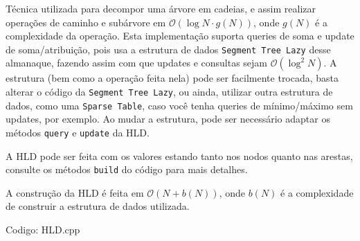 \documentclass[10pt, a4paper, oneside]{book}
\begin{document}
Técnica utilizada para decompor uma árvore em cadeias, e assim realizar operações de caminho e subárvore em $\mathcal{O}(\log N \cdot g(N))$, onde $g(N)$ é a complexidade da operação. Esta implementação suporta queries de soma e update de soma/atribuição, pois usa a estrutura de dados \texttt{Segment Tree Lazy} desse almanaque, fazendo assim com que updates e consultas sejam  $\mathcal{O}(\log^2 N)$. A estrutura (bem como a operação feita nela) pode ser facilmente trocada, basta alterar o código da \texttt{Segment Tree Lazy}, ou ainda, utilizar outra estrutura de dados, como uma \texttt{Sparse Table}, caso você tenha queries de mínimo/máximo sem updates, por exemplo. Ao mudar a estrutura, pode ser necessário adaptar os métodos \texttt{query} e \texttt{update} da HLD.



A HLD pode ser feita com os valores estando tanto nos nodos quanto nas arestas, consulte os métodos \texttt{build} do código para mais detalhes.



A construção da HLD é feita em $\mathcal{O}(N + b(N))$, onde $b(N)$ é a complexidade de construir a estrutura de dados utilizada.
\hfill

Codigo: HLD.cpp
\end{document}
